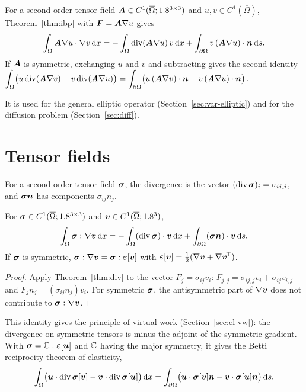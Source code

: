 \begin{theorem}\label{thm:ibp-matrix}
%
For a second-order tensor field $\bm{A}\in C^1(\overline\Omega;1.8^{3\times3})$ and
$u,v\in C^1(\overline\Omega)$, Theorem~\ref{thm:ibp} with $\bm{F}=\bm{A}\nabla u$ gives
\[
  \int_\Omega\bm{A}\nabla u\cdot\nabla v\,\mathrm{d} x
  =-\int_\Omega\operatorname{div}(\bm{A}\nabla u)\,v\,\mathrm{d} x+\int_{\partial\Omega}v\,(\bm{A}\nabla u)\cdot\bm{n}\,\mathrm{d} s .
\]
If $\bm{A}$ is symmetric, exchanging $u$ and $v$ and subtracting gives the
second identity
$\displaystyle \int_\Omega\bigl(u\operatorname{div}(\bm{A}\nabla v)-v\operatorname{div}(\bm{A}\nabla u)\bigr)
=\int_{\partial\Omega}\bigl(u\,(\bm{A}\nabla v)\cdot\bm{n}-v\,(\bm{A}\nabla u)\cdot\bm{n}\bigr)$.
\end{theorem}
It is used for the general elliptic operator (Section~\ref{sec:var-elliptic})
and for the diffusion problem (Section~\ref{sec:diff}).

\section{Tensor fields}
For a second-order tensor field $\bm{\sigma}$, the divergence is the vector
$(\operatorname{div}\bm{\sigma})_i=\sigma_{ij,j}$, and $\bm{\sigma}\bm{n}$ has components $\sigma_{ij}n_j$.

\begin{theorem}\label{thm:ibp-tensor}
%
For $\bm{\sigma}\in C^1(\overline\Omega;1.8^{3\times3})$ and
$\bm{v}\in C^1(\overline\Omega;1.8^3)$,
\[
  \int_\Omega\bm{\sigma}:\nabla\bm{v}\,\mathrm{d} x=-\int_\Omega(\operatorname{div}\bm{\sigma})\cdot\bm{v}\,\mathrm{d} x
  +\int_{\partial\Omega}(\bm{\sigma}\bm{n})\cdot\bm{v}\,\mathrm{d} s .
\]
If $\bm{\sigma}$ is symmetric, $\bm{\sigma}:\nabla\bm{v}=\bm{\sigma}:\bm{\varepsilon}[\bm{v}]$ with
$\bm{\varepsilon}[\bm{v}]=\tfrac12(\nabla\bm{v}+\nabla\bm{v}^{\!\top})$.
\end{theorem}
\begin{proof}
Apply Theorem~\ref{thm:div} to the vector $F_j=\sigma_{ij}v_i$:
$F_{j,j}=\sigma_{ij,j}v_i+\sigma_{ij}v_{i,j}$ and $F_jn_j=(\sigma_{ij}n_j)v_i$.
For symmetric $\bm{\sigma}$, the antisymmetric part of $\nabla\bm{v}$ does not
contribute to $\bm{\sigma}:\nabla\bm{v}$.
\end{proof}
This identity gives the principle of virtual work (Section~\ref{sec:el-vw}):
the divergence on symmetric tensors is minus the adjoint of the symmetric
gradient. With $\bm{\sigma}=\mathbb{C}:\bm{\varepsilon}[\bm{u}]$ and $\mathbb{C}$ having the major symmetry, it
gives the Betti reciprocity theorem of elasticity,
\[
  \int_\Omega\bigl(\bm{u}\cdot\operatorname{div}\bm{\sigma}[\bm{v}]-\bm{v}\cdot\operatorname{div}\bm{\sigma}[\bm{u}]\bigr)\,\mathrm{d} x
  =\int_{\partial\Omega}\bigl(\bm{u}\cdot\bm{\sigma}[\bm{v}]\bm{n}-\bm{v}\cdot\bm{\sigma}[\bm{u}]\bm{n}\bigr)\,\mathrm{d} s .
\]

